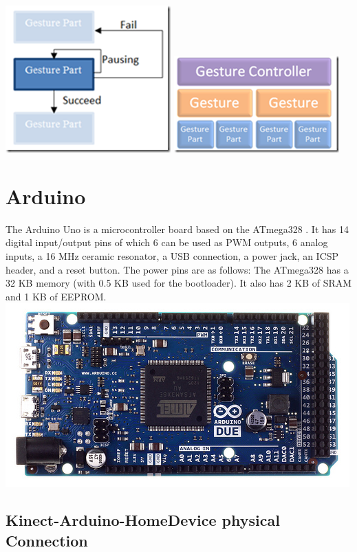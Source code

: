 \includegraphics[scale=2]{GestureArchitecture1.png}
\includegraphics[scale=2]{GestureArchitecture2.png}

\section{Arduino}

The Arduino Uno is a microcontroller board based on the ATmega328 . It has 14 digital input/output pins of which 6 can be used as PWM outputs, 6 analog inputs, a 16 MHz ceramic resonator, a USB connection, a power jack, an ICSP header, and a reset button.
The power pins are as follows:
The ATmega328 has a 32 KB memory (with 0.5 KB used for the bootloader). It also has 2 KB of SRAM and 1 KB of EEPROM.
\includegraphics[scale=2]{ArduinoUNOboard.jpg}

\subsection{Kinect-Arduino-HomeDevice physical Connection}

